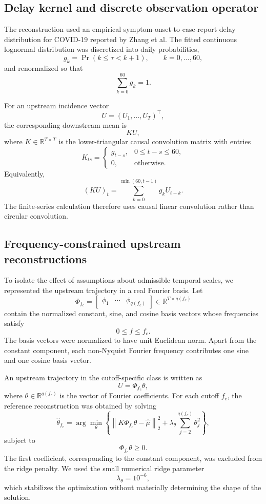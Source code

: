 \subsection{Delay kernel and discrete observation operator}
\label{sec:appendix_delay_operator}

The reconstruction used an empirical symptom-onset-to-case-report delay
distribution for COVID-19 reported by Zhang et al. The fitted continuous
lognormal distribution was discretized into daily probabilities,
\[
g_k
=
\Pr(k\leq \tau<k+1),
\qquad k=0,\ldots,60,
\]
and renormalized so that
\[
\sum_{k=0}^{60}g_k=1.
\]

For an upstream incidence vector
\[
U=(U_1,\ldots,U_T)^\top,
\]
the corresponding downstream mean is
\[
KU,
\]
where \(K\in\mathbb R^{T\times T}\) is the lower-triangular causal convolution
matrix with entries
\[
K_{ts}
=
\begin{cases}
g_{t-s},&0\leq t-s\leq 60,\\
0,&\text{otherwise}.
\end{cases}
\]
Equivalently,
\[
(KU)_t
=
\sum_{k=0}^{\min(60,t-1)}g_kU_{t-k}.
\]
The finite-series calculation therefore uses causal linear convolution rather
than circular convolution.

\subsection{Frequency-constrained upstream reconstructions}
\label{sec:appendix_cutoff_reconstruction}

To isolate the effect of assumptions about admissible temporal scales, we
represented the upstream trajectory in a real Fourier basis. Let
\[
\Phi_{f_c}
=
\begin{bmatrix}
\phi_1 & \cdots & \phi_{q(f_c)}
\end{bmatrix}
\in\mathbb R^{T\times q(f_c)}
\]
contain the normalized constant, sine, and cosine basis vectors whose
frequencies satisfy
\[
0\leq f\leq f_c.
\]
The basis vectors were normalized to have unit Euclidean norm. Apart from the
constant component, each non-Nyquist Fourier frequency contributes one sine
and one cosine basis vector.

An upstream trajectory in the cutoff-specific class is written as
\[
U=\Phi_{f_c}\theta,
\]
where \(\theta\in\mathbb R^{q(f_c)}\) is the vector of Fourier coefficients.
For each cutoff \(f_c\), the reference reconstruction was obtained by solving
\[
\widehat{\theta}_{f_c}
=
\arg\min_{\theta}
\left\{
\left\|
K\Phi_{f_c}\theta-\widehat{\mu}
\right\|_2^2
+
\lambda_\theta
\sum_{j=2}^{q(f_c)}\theta_j^2
\right\},
\]
subject to
\[
\Phi_{f_c}\theta\geq 0.
\]
The first coefficient, corresponding to the constant component, was excluded
from the ridge penalty. We used the small numerical ridge parameter
\[
\lambda_\theta=10^{-6},
\]
which stabilizes the optimization without materially determining the shape of
the solution.

